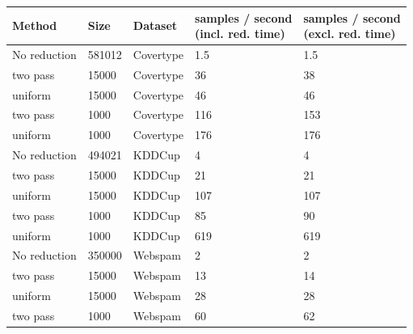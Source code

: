 \begin{table}[ht!]
    \centering
    \begin{tabular}{ l | l| l| l| l}
        \hline
        \textbf{Method} & \textbf{Size} & \textbf{Dataset} & \makecell{\textbf{samples / second}       \\ \textbf{(incl. red. time)}} & \makecell{\textbf{samples / second} \\ \textbf{(excl. red. time)}}\\ \hline
        No reduction    & 581012        & Covertype        & 1.5                                 & 1.5 \\ \hline
        two pass        & 15000         & Covertype        & 36                                  & 38  \\ \hline
        uniform         & 15000         & Covertype        & 46                                  & 46  \\ \hline
        two pass        & 1000          & Covertype        & 116                                 & 153 \\ \hline
        uniform         & 1000          & Covertype        & 176                                 & 176 \\ \hline
        No reduction    & 494021        & KDDCup           & 4                                   & 4   \\ \hline
        two pass        & 15000         & KDDCup           & 21                                  & 21  \\ \hline
        uniform         & 15000         & KDDCup           & 107                                 & 107 \\ \hline
        two pass        & 1000          & KDDCup           & 85                                  & 90  \\ \hline
        uniform         & 1000          & KDDCup           & 619                                 & 619 \\ \hline
        No reduction    & 350000        & Webspam          & 2                                   & 2   \\ \hline
        two pass        & 15000         & Webspam          & 13                                  & 14  \\ \hline
        uniform         & 15000         & Webspam          & 28                                  & 28  \\ \hline
        two pass        & 1000          & Webspam          & 60                                  & 62  \\ \hline

\end{tabular}
\end{table}

